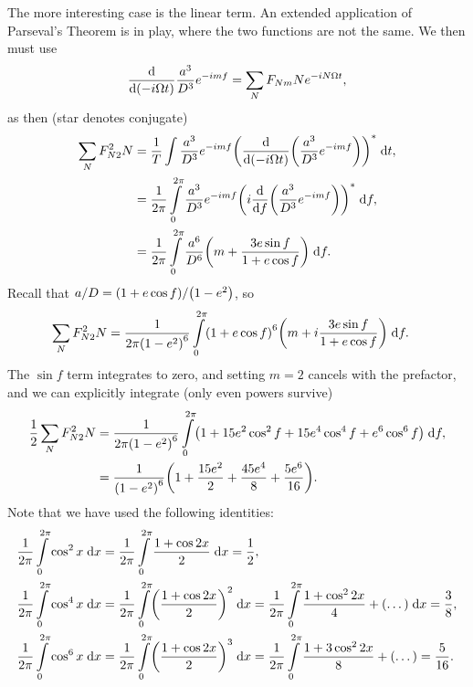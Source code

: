 \documentclass[11pt,
        usenames, %
        dvipsnames %
    ]{article}
\newcommand*{\rd}[2]{\frac{\mathrm{d}#1}{\mathrm{d}#2}}
\DeclarePairedDelimiter\p{\lparen}{\rparen}
\begin{document}
The more interesting case is the linear term. An extended application of
Parseval's Theorem is in play, where the two functions are not the same. We then
must use
\begin{equation}
    \rd{}{\p*{-i \Omega t}}\frac{a^3}{D^3}e^{-imf}
        = \sum\limits_N F_{Nm} Ne^{-iN\Omega t},
\end{equation}
as then (star denotes conjugate)
\begin{align}
    \sum\limits_N F_{N2}^2 N &= \frac{1}{T}\int\limits
        \frac{a^3}{D^3}e^{-imf}
            \p*{\rd{}{\p*{-i \Omega t}}\p*{\frac{a^3}{D^3}
                e^{-imf}}}^*\;\mathrm{d}t,\\
        &= \frac{1}{2\pi} \int\limits_0^{2\pi}
            \frac{a^3}{D^3}e^{-imf}
            \p*{i\rd{}{f}\p*{\frac{a^3}{D^3}
                e^{-imf}}}^*\;\mathrm{d}f,\\
        &= \frac{1}{2\pi} \int\limits_0^{2\pi}
            \frac{a^6}{D^6}\p*{m + \frac{3e\sin f}{1 + e\cos f}}
                \;\mathrm{d}f.
\end{align}
Recall that $a/D = \p*{1 + e\cos f} / \p*{1 - e^2}$, so
\begin{align}
    \sum\limits_N F_{N2}^2 N
        &= \frac{1}{2\pi\p*{1 - e^2}^6} \int\limits_0^{2\pi}
            \p*{1 + e\cos f}^6\p*{m + i\frac{3e\sin f}{1 + e\cos f}}
                \;\mathrm{d}f.
\end{align}
The $\sin f$ term integrates to zero, and setting $m = 2$ cancels with the
prefactor, and we can explicitly integrate (only even powers survive)
\begin{align}
    \frac{1}{2}\sum\limits_N F_{N2}^2N
        &= \frac{1}{2\pi\p*{1 - e^2}^6}\int\limits_0^{2\pi}
            \p*{1 + 15e^2\cos^2f + 15e^4\cos^4f
                + e^6\cos^6 f}\;\mathrm{d}f,\\
        &= \frac{1}{\p*{1 - e^2}^6}\p*{1 + \frac{15e^2}{2}
            + \frac{45 e^4}{8} + \frac{5e^6}{16}}.
\end{align}
Note that we have used the following identities:
\begin{align}
    \frac{1}{2\pi}\int\limits_0^{2\pi}\cos^2x\;\mathrm{d}x
        &= \frac{1}{2\pi}
            \int\limits_0^{2\pi}\frac{1 + \cos 2x}{2}\;\mathrm{d}x
        = \frac{1}{2},\\
    \frac{1}{2\pi}\int\limits_0^{2\pi}\cos^4x\;\mathrm{d}x
        &= \frac{1}{2\pi}
            \int\limits_0^{2\pi}\p*{\frac{1 + \cos 2x}{2}}^2\;\mathrm{d}x
        = \frac{1}{2\pi}
            \int\limits_0^{2\pi}\frac{1 + \cos^2 2x}{4}
                + (\dots)\;\mathrm{d}x
        = \frac{3}{8},\\
    \frac{1}{2\pi}\int\limits_0^{2\pi}\cos^6x\;\mathrm{d}x
        &= \frac{1}{2\pi}
            \int\limits_0^{2\pi}\p*{\frac{1 + \cos 2x}{2}}^3\;\mathrm{d}x
        = \frac{1}{2\pi}
            \int\limits_0^{2\pi}\frac{1 + 3\cos^2 2x}{8}
                 + (\dots)
        = \frac{5}{16}.
\end{align}
\end{document}
